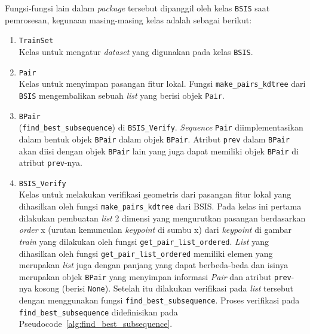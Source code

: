 Fungsi-fungsi lain dalam \textit{package} tersebut dipanggil oleh kelas \texttt{BSIS} saat pemrosesan, kegunaan masing-masing kelas adalah sebagai berikut:
\begin{enumerate}
	\item \texttt{TrainSet} \\
	Kelas untuk mengatur \textit{dataset} yang digunakan pada kelas \texttt{BSIS}.
	\item \texttt{Pair} \\
	Kelas untuk menyimpan pasangan fitur lokal. Fungsi \texttt{make\_pairs\_kdtree} dari \texttt{BSIS} mengembalikan sebuah \textit{list} yang berisi objek \texttt{Pair}.
	\item \texttt{BPair} \\
	 \newline (\texttt{find\_best\_subsequence}) di \texttt{BSIS\_Verify}. \textit{Sequence} \texttt{Pair} diimplementasikan dalam bentuk objek \texttt{BPair} dalam objek \texttt{BPair}. Atribut \texttt{prev} dalam \texttt{BPair} akan diisi dengan objek \texttt{BPair} lain yang juga dapat memiliki objek \texttt{BPair} di atribut \texttt{prev}-nya. 
	\item \texttt{BSIS\_Verify} \\
	Kelas untuk melakukan verifikasi geometris dari pasangan fitur lokal yang dihasilkan oleh fungsi \texttt{make\_pairs\_kdtree} dari BSIS. Pada kelas ini pertama dilakukan pembuatan \textit{list} 2 dimensi yang mengurutkan pasangan berdasarkan \textit{order} x (urutan kemunculan \textit{keypoint} di sumbu x) dari \textit{keypoint} di gambar \textit{train} yang dilakukan oleh fungsi \texttt{get\_pair\_list\_ordered}. \textit{List} yang dihasilkan oleh fungsi \texttt{get\_pair\_list\_ordered} memiliki elemen yang merupakan \textit{list} juga dengan panjang yang dapat berbeda-beda dan isinya merupakan objek \texttt{BPair} yang menyimpan informasi \textit{Pair} dan atribut \texttt{prev}-nya kosong (berisi \texttt{None}). Setelah itu dilakukan verifikasi pada \textit{list} tersebut dengan menggunakan fungsi \texttt{find\_best\_subsequence}. Proses verifikasi pada \texttt{find\_best\_subsequence} didefinisikan pada Pseudocode~\ref{alg:find_best_subsequence}. \\
\end{enumerate}
